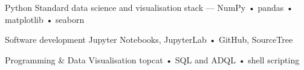 

\begin{cvskills}

  \cvskill
    {Python} %
    {Standard data science and visualisation stack --- NumPy • pandas • matplotlib • seaborn} %

  \cvskill
    {Software development} %
    {Jupyter Notebooks, JupyterLab • GitHub, SourceTree} %


  \cvskill
    {Programming \& Data Visualisation} %
    {topcat • SQL and ADQL • shell scripting} %

\end{cvskills}
